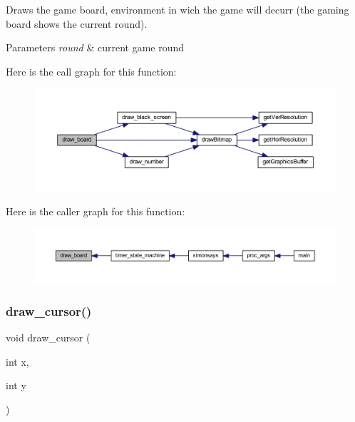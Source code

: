 Draws the game board, environment in wich the game will decurr (the gaming board shows the current round). 


\begin{DoxyParams}{Parameters}
{\em round} & current game round \\
\hline
\end{DoxyParams}
Here is the call graph for this function\+:\nopagebreak
\begin{figure}[H]
\begin{center}
\leavevmode
\includegraphics[width=350pt]{group___bitmap_gaa7519d8a181750afa183c3350c5f9598_cgraph}
\end{center}
\end{figure}
Here is the caller graph for this function\+:\nopagebreak
\begin{figure}[H]
\begin{center}
\leavevmode
\includegraphics[width=350pt]{group___bitmap_gaa7519d8a181750afa183c3350c5f9598_icgraph}
\end{center}
\end{figure}
\mbox{\label{group___bitmap_ga108608b0f2d804c84a271547036b6ffd}} 
\subsubsection{\texorpdfstring{draw\+\_\+cursor()}{draw\_cursor()}}
{\footnotesize\ttfamily void draw\+\_\+cursor (\begin{DoxyParamCaption}\item[{int}]{x,  }\item[{int}]{y }\end{DoxyParamCaption})}



